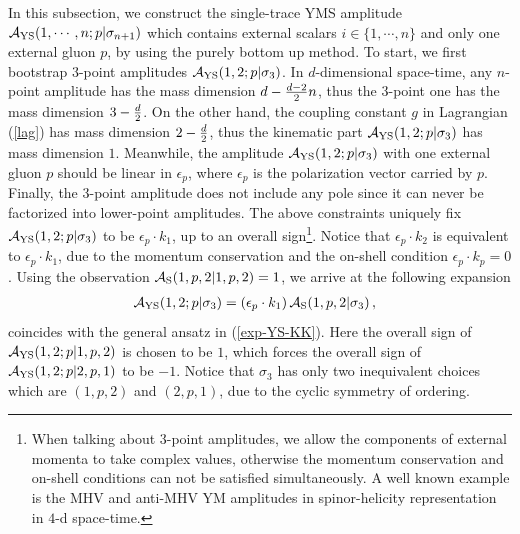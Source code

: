 \documentclass[preprint,showpacs,onecolumn,nofootinbib]{revtex4}
\newcommand{\bea}{\begin{eqnarray}}
\newcommand{\eea}{\end{eqnarray}}
\def\eref#1{(\ref{#1})}
\begin{document}
In this subsection, we construct the single-trace YMS amplitude ${\cal A}_{\rm YS}(1,\cdots,n;p|\sigma_{n+1})$ which contains external scalars $i\in\{1,\cdots,n\}$ and only one external gluon $p$, by using the purely bottom up method. To start, we first bootstrap $3$-point amplitudes ${\cal A}_{\rm YS}(1,2;p|\sigma_3)$.
In $d$-dimensional space-time, any $n$-point amplitude has the mass dimension $d-{d-2\over2}n$, thus the $3$-point one has the mass dimension $3-{d\over2}$. On the other hand, the coupling constant $g$ in Lagrangian \eref{lag} has mass dimension $2-{d\over2}$, thus the kinematic part ${\cal A}_{\rm YS}(1,2;p|\sigma_3)$ has mass dimension $1$. Meanwhile, the amplitude ${\cal A}_{\rm YS}(1,2;p|\sigma_3)$ with one external gluon $p$
should be linear in $\epsilon_p$, where $\epsilon_p$ is the polarization vector carried by $p$. Finally, the $3$-point amplitude does not include any pole since it can never be factorized into lower-point amplitudes. The above constraints uniquely fix ${\cal A}_{\rm YS}(1,2;p|\sigma_3)$ to be $\epsilon_p\cdot k_1$, up to an overall sign\footnote{When talking about $3$-point amplitudes, we allow the components of external momenta to take complex values, otherwise the momentum conservation and on-shell conditions can not be satisfied simultaneously. A well known example is the MHV and anti-MHV YM amplitudes in spinor-helicity representation in $4$-d space-time.}. Notice that $\epsilon_p\cdot k_2$ is equivalent to $\epsilon_p\cdot k_1$, due to the momentum conservation and the on-shell condition $\epsilon_p\cdot k_p=0$. Using the observation ${\cal A}_{\rm S}(1,p,2|1,p,2)=1$, we arrive at the following expansion
%
\bea
{\cal A}_{\rm YS}(1,2;p|\sigma_3)=(\epsilon_p\cdot k_1)\,{\cal A}_{\rm S}(1,p,2|\sigma_3)\,,~~\label{start-point}
\eea
%
coincides with the general ansatz in \eref{exp-YS-KK}.
Here the overall sign of ${\cal A}_{\rm YS}(1,2;p|1,p,2)$ is chosen to be $1$, which forces the overall sign of ${\cal A}_{\rm YS}(1,2;p|2,p,1)$
to be $-1$. Notice that $\sigma_3$ has only two inequivalent choices which are $(1,p,2)$ and $(2,p,1)$, due to the cyclic symmetry of ordering.
\end{document}
